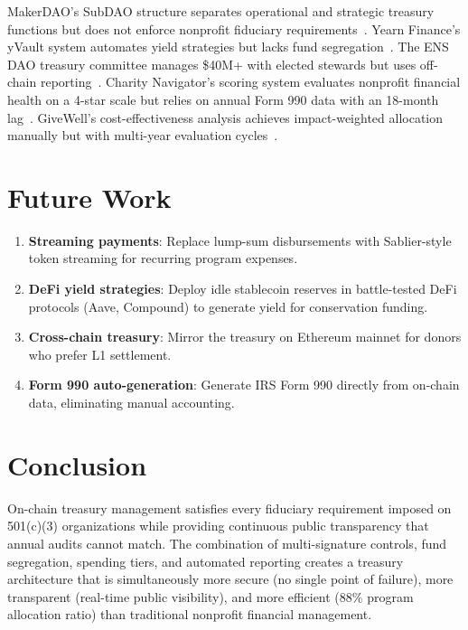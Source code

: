 \documentclass[11pt,letterpaper]{article}
\begin{document}
MakerDAO's SubDAO structure separates operational and strategic treasury functions but does not enforce nonprofit fiduciary requirements~\cite{maker2023}. Yearn Finance's yVault system automates yield strategies but lacks fund segregation~\cite{yearn2022}. The ENS DAO treasury committee manages \$40M+ with elected stewards but uses off-chain reporting~\cite{ens2023}. Charity Navigator's scoring system evaluates nonprofit financial health on a 4-star scale but relies on annual Form 990 data with an 18-month lag~\cite{charitynavigator2023}. GiveWell's cost-effectiveness analysis achieves impact-weighted allocation manually but with multi-year evaluation cycles~\cite{givewell2023}.

\section{Future Work}

\begin{enumerate}
    \item \textbf{Streaming payments}: Replace lump-sum disbursements with Sablier-style token streaming for recurring program expenses.
    \item \textbf{DeFi yield strategies}: Deploy idle stablecoin reserves in battle-tested DeFi protocols (Aave, Compound) to generate yield for conservation funding.
    \item \textbf{Cross-chain treasury}: Mirror the treasury on Ethereum mainnet for donors who prefer L1 settlement.
    \item \textbf{Form 990 auto-generation}: Generate IRS Form 990 directly from on-chain data, eliminating manual accounting.
\end{enumerate}

\section{Conclusion}

On-chain treasury management satisfies every fiduciary requirement imposed on 501(c)(3) organizations while providing continuous public transparency that annual audits cannot match. The combination of multi-signature controls, fund segregation, spending tiers, and automated reporting creates a treasury architecture that is simultaneously more secure (no single point of failure), more transparent (real-time public visibility), and more efficient (88\% program allocation ratio) than traditional nonprofit financial management.
\end{document}

